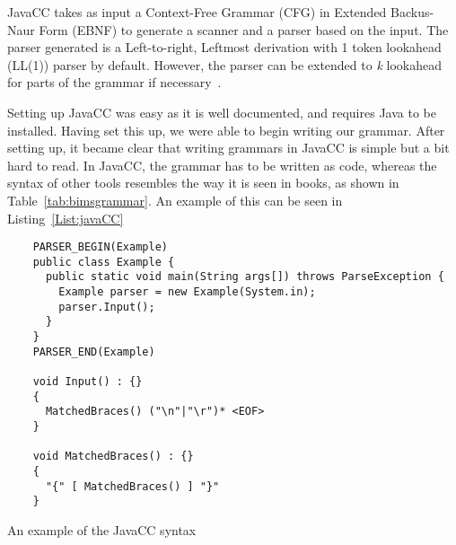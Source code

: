 JavaCC takes as input a Context-Free Grammar (CFG) in Extended Backus-Naur Form (EBNF) to generate a scanner and a parser based on the input. The parser generated is a Left-to-right, Leftmost derivation with 1 token lookahead (LL(1)) parser by default. However, the parser can be extended to \textit{k} lookahead for parts of the grammar if necessary~\cite{JavaCC2021}.

Setting up JavaCC was easy as it is well documented, and requires Java to be installed. Having set this up, we were able to begin writing our grammar. After setting up, it became clear that writing grammars in JavaCC is simple but a bit hard to read. In JavaCC, the grammar has to be written as code, whereas the syntax of other tools resembles the way it is seen in books, as shown in Table~\ref{tab:bimsgrammar}. An example of this can be seen in Listing~\ref{List:javaCC}

\begin{listing}[htb!]
  \centering
  \begin{verbatim}
    PARSER_BEGIN(Example)
    public class Example {
      public static void main(String args[]) throws ParseException {
        Example parser = new Example(System.in);
        parser.Input();
      }
    }
    PARSER_END(Example)

    void Input() : {}
    {
      MatchedBraces() ("\n"|"\r")* <EOF>
    }

    void MatchedBraces() : {}
    {
      "{" [ MatchedBraces() ] "}"
    }
\end{verbatim}
  \caption{An example of the JavaCC syntax}
  \label{List:javaCC}
\end{listing}




